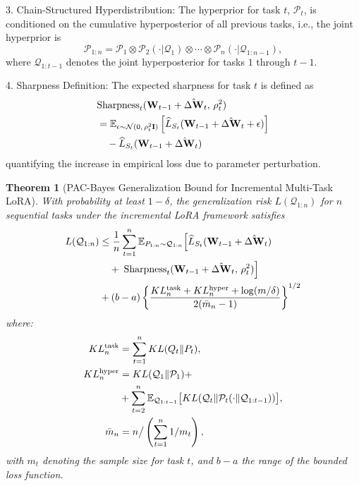 \documentclass[letterpaper]{article} %
\newtheorem{theorem}{Theorem}
\begin{document}
3. Chain-Structured Hyperdistribution: The hyperprior for task $t$, $\mathcal{P}_t$, is conditioned on the cumulative hyperposterior of all previous tasks, i.e., the joint hyperprior is
   $$
   \mathcal{P}_{1:n} = \mathcal{P}_1 \otimes \mathcal{P}_2(\cdot|\mathcal{Q}_1) \otimes \cdots \otimes \mathcal{P}_n(\cdot|\mathcal{Q}_{1:n-1}),
   $$ where $\mathcal{Q}_{1:t-1}$ denotes the joint hyperposterior for tasks $1$ through $t-1$.

4. Sharpness Definition: The expected sharpness for task $t$ is defined as
\begin{align}
&\mathrm{Sharpness}_t(\mathbf{W}_{t-1} + \hat{\Delta\mathbf{W}}_t,\, \rho_t^2) \notag\\
& = \mathbb{E}_{\epsilon \sim \mathcal{N}(0,\, \rho_t^2 \mathbf{I})}
\left[ \widehat{L}_{S_t}(\mathbf{W}_{t-1} + \hat{\Delta\mathbf{W}}_t + \epsilon) \right] \notag\\
&\quad - \widehat{L}_{S_t}(\mathbf{W}_{t-1} + \hat{\Delta\mathbf{W}}_t) \notag
\end{align}
quantifying the increase in empirical loss due to parameter perturbation.

\begin{theorem}[PAC-Bayes Generalization Bound for Incremental Multi-Task LoRA]
With probability at least $1-\delta$, the generalization risk $L(\mathcal{Q}_{1:n})$ for $n$ sequential tasks under the incremental LoRA framework satisfies
\begin{align}
L(\mathcal{Q}_{1:n}) &\leq \frac{1}{n} \sum_{t=1}^n 
    \mathbb{E}_{P_{1:n} \sim \mathcal{Q}_{1:n}}
    \Big[
        \widehat{L}_{S_t}(\mathbf{W}_{t-1} + \hat{\Delta\mathbf{W}}_t)
    \notag \\
&\quad +\; \mathrm{Sharpness}_t(\mathbf{W}_{t-1} + \hat{\Delta\mathbf{W}}_t,\, \rho_t^2)
    \Big] 
    \notag \\
& + (b-a) \left\{ 
    \frac{KL_n^{\text{task}} + KL_n^{\text{hyper}} + \log(m/\delta)}
         {2(\bar{m}_n - 1)}
\right\}^{1/2}
\label{eq:lora-pac-bayes-bound}
\end{align}
where:
\begin{align}
KL_n^{\mathrm{task}} &= \sum_{t=1}^n KL(Q_t\|P_t), \notag  \\
KL_n^{\mathrm{hyper}} &= KL(\mathcal{Q}_1 \| \mathcal{P}_1) +  \\ &+\sum_{t=2}^n \mathbb{E}_{\mathcal{Q}_{1:t-1}}\big[KL(\mathcal{Q}_t \| \mathcal{P}_t(\cdot \| \mathcal{Q}_{1:t-1}))\big], \notag\\
\bar{m}_n &= n \big/ \left(\sum_{t=1}^n 1/m_t\right), \notag
\end{align}
with $m_t$ denoting the sample size for task $t$, and $b-a$ the range of the bounded loss function.
\end{theorem}
\end{document}
